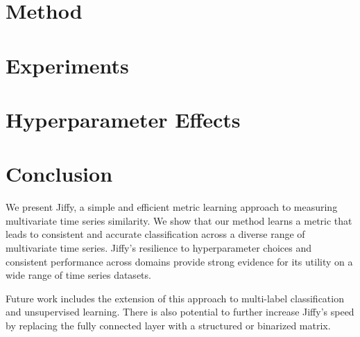 \documentclass[sigconf]{acmart}
\begin{document}
\section{Method} \label{sec:method}



\section{Experiments} \label{sec:experiments}




\section{Hyperparameter Effects} \label{sec:network}



\vspace{-1mm}
\section{Conclusion} \label{sec:conclusion}

We present Jiffy, a simple and efficient metric learning approach to measuring multivariate time series similarity. We show that our method learns a metric that leads to consistent and accurate classification across a diverse range of multivariate time series. Jiffy's resilience to hyperparameter choices and consistent performance across domains provide strong evidence for its utility on a wide range of time series datasets.

Future work includes the extension of this approach to multi-label classification and unsupervised learning. There is also potential to further increase Jiffy's speed by replacing the fully connected layer with a structured \citep{structuredMats} or binarized \citep{xnornet} matrix. %

% 
% 
% 
% 


\end{document}
